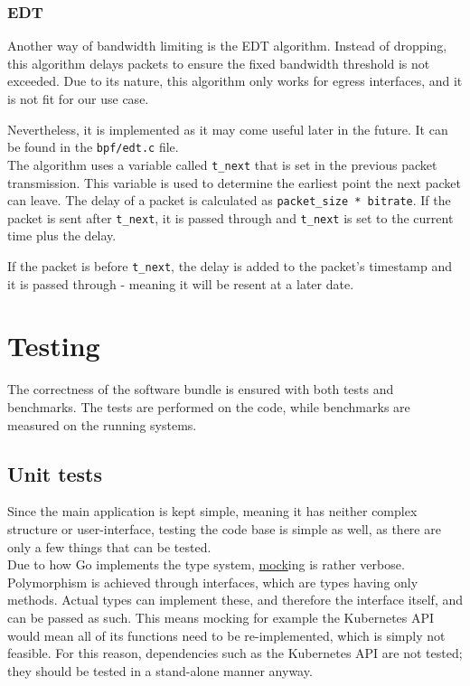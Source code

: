 \subsubsection{EDT}
Another way of bandwidth limiting is the EDT algorithm. Instead of dropping, this algorithm delays packets to ensure the fixed bandwidth threshold is not exceeded. Due to its nature, this algorithm only works for egress interfaces, and it is not fit for our use case.

Nevertheless, it is implemented as it may come useful later in the future. It can be found in the \texttt{bpf/edt.c} file. \\

The algorithm uses a variable called \texttt{t\_next} that is set in the previous packet transmission. This variable is used to determine the earliest point the next packet can leave. The delay of a packet is calculated as \texttt{packet\_size * bitrate}. If the packet is sent after \texttt{t\_next}, it is passed through and \texttt{t\_next} is set to the current time plus the delay.

If the packet is before \texttt{t\_next}, the delay is added to the packet's timestamp and it is passed through - meaning it will be resent at a later date.

\newpage
\section{Testing}
The correctness of the software bundle is ensured with both tests and benchmarks. The tests are performed on the code, while benchmarks are measured on the running systems.

\subsection{Unit tests}
Since the main application is kept simple, meaning it has neither complex structure or user-interface, testing the code base is simple as well, as there are only a few things that can be tested. \\

Due to how Go implements the type system, \underline{\gls{mock}}ing is rather verbose. Polymorphism is achieved through interfaces, which are types having only methods. Actual types can implement these, and therefore the interface itself, and can be passed as such. This means mocking for example the Kubernetes API would mean all of its functions need to be re-implemented, which is simply not feasible. For this reason, dependencies such as the Kubernetes API are not tested; they should be tested in a stand-alone manner anyway. \\

